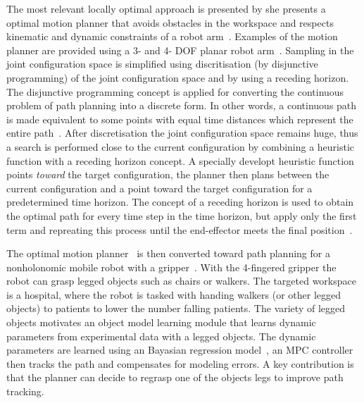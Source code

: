 The most relevant locally optimal approach is presented by \citeauthor{sabbaghnovin_model_2021} she presents a optimal motion planner that avoids obstacles in the workspace and respects kinematic and dynamic constraints of a robot arm~\cite{sabbaghnovin_optimal_2016}. Examples of the motion planner are provided using a 3- and 4- \ac{DOF} planar robot arm~\cite{sabbaghnovin_optimal_2016}. Sampling in the joint configuration space is simplified using discritisation (by disjunctive programming) of the joint configuration space and by using a receding horizon. The disjunctive programming concept is applied for converting the continuous problem of path planning into a discrete form. In other words, a continuous path is made equivalent to some points with equal time distances which represent the entire path~\cite{sabbaghnovin_optimal_2016}. After discretisation the joint configuration space remains huge, thus a search is performed close to the current configuration by combining a heuristic function with a receding horizon concept. A specially developt heuristic function points \textit{toward} the target configuration, the planner then plans between the current configuration and a point toward the target configuration for a predetermined time horizon. The concept of a receding horizon is used to obtain the optimal path for every time step in the time horizon, but apply only the first term and repreating this process until the end-effector meets the final position~\cite{sabbaghnovin_optimal_2016}.\bs

The optimal motion planner~\cite{sabbaghnovin_optimal_2016} is then converted toward path planning for a nonholonomic mobile robot with a gripper~\cite{novin_dynamic_2018}. With the 4-fingered gripper the robot can grasp legged objects such as chairs or walkers. The targeted workspace is a hospital, where the robot is tasked with handing walkers (or other legged objects) to patients to lower the number falling patients. The variety of legged objects motivates an object model learning module that learns dynamic parameters from experimental data with a legged objects. The dynamic parameters are learned using an Bayasian regression model~\cite{scholz_navigation_2016}, an \ac{MPC} controller then tracks the path and compensates for modeling errors. A key contribution is that the planner can decide to regrasp one of the objects legs to improve path tracking.\bs

